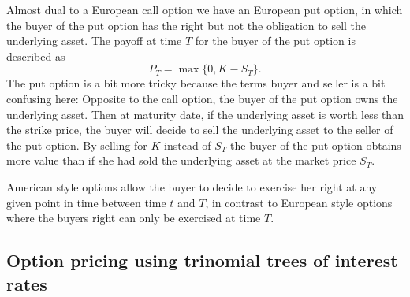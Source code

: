 Almost dual to a European call option we have an European
put option, in which the buyer of the put option has the
right but not the obligation to sell the underlying
asset. The payoff at time $T$ for the buyer of the put
option is described as
%
\begin{equation}
  P_T = \operatorname{max}\{0, K-S_T\} .
\end{equation}
%
The put option is a bit more tricky because the terms buyer
and seller is a bit confusing here: Opposite to the call
option, the buyer of the put option owns the underlying
asset. Then at maturity date, if the underlying asset is
worth less than the strike price, the buyer will decide to
sell the underlying asset to the seller of the put
option. By selling for $K$ instead of $S_T$ the buyer of the
put option obtains more value than if she had sold the
underlying asset at the market price $S_T$.

American style options allow the buyer to decide to exercise
her right at any given point in time between time $t$ and
$T$, in contrast to European style options where the buyers
right can only be exercised at time $T$.


\subsection{Option pricing using trinomial trees of interest rates}
